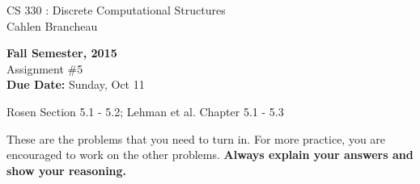 \setlength{\oddsidemargin}{12pt}
\setlength{\textwidth}{6.5in}
\setlength{\textheight}{9in}
\pagestyle{empty}
\setlength{\parskip}{7pt plus 2pt minus 2pt}



\begin{center}
{{\large CS 330 : Discrete Computational Structures}}\\
Cahlen Brancheau


{\bf Fall Semester, 2015}\\

{\sc Assignment \#5}\\
{\bf Due Date:}  Sunday, Oct 11
\end{center}

 Rosen Section 5.1 - 5.2; Lehman et al. Chapter 5.1 - 5.3

These are the problems that you need to turn in. For more
practice, you are encouraged to work on the other problems. {\bf Always
explain your answers and show your reasoning.}


